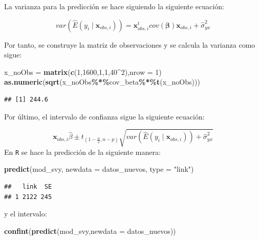 \documentclass[
  12pt,
]{book}
\newenvironment{Shaded}{\begin{snugshade}}{\end{snugshade}}
\newcommand{\AttributeTok}[1]{\textcolor[rgb]{0.13,0.29,0.53}{#1}}
\newcommand{\DecValTok}[1]{\textcolor[rgb]{0.00,0.00,0.81}{#1}}
\newcommand{\FunctionTok}[1]{\textcolor[rgb]{0.13,0.29,0.53}{\textbf{#1}}}
\newcommand{\NormalTok}[1]{#1}
\newcommand{\OtherTok}[1]{\textcolor[rgb]{0.56,0.35,0.01}{#1}}
\newcommand{\SpecialCharTok}[1]{\textcolor[rgb]{0.81,0.36,0.00}{\textbf{#1}}}
\newcommand{\StringTok}[1]{\textcolor[rgb]{0.31,0.60,0.02}{#1}}
\begin{document}
La varianza para la predicción se hace siguiendo la siguiente ecuación:

\[
var\left(\hat{E}\left(y_{i}\mid\boldsymbol{x}_{obs,i}\right)\right)=\boldsymbol{x}_{obs,i}^{t}cov\left(\boldsymbol{\beta}\right)\boldsymbol{x}_{obs,i} + \hat{\sigma}^2_{yx}
\]

Por tanto, se construye la matriz de observaciones y se calcula la varianza como sigue:

\begin{Shaded}
\begin{Highlighting}[]
\NormalTok{x\_noObs }\OtherTok{=} \FunctionTok{matrix}\NormalTok{(}\FunctionTok{c}\NormalTok{(}\DecValTok{1}\NormalTok{,}\DecValTok{1600}\NormalTok{,}\DecValTok{1}\NormalTok{,}\DecValTok{1}\NormalTok{,}\DecValTok{40}\SpecialCharTok{\^{}}\DecValTok{2}\NormalTok{),}\AttributeTok{nrow =} \DecValTok{1}\NormalTok{)}
\FunctionTok{as.numeric}\NormalTok{(}\FunctionTok{sqrt}\NormalTok{(x\_noObs}\SpecialCharTok{\%*\%}\NormalTok{cov\_beta}\SpecialCharTok{\%*\%}\FunctionTok{t}\NormalTok{(x\_noObs)))}
\end{Highlighting}
\end{Shaded}

\begin{verbatim}
## [1] 244.6
\end{verbatim}

Por último, el intervalo de confianza sigue la siguiente ecuación:

\[
\boldsymbol{x}_{obs,i}\hat{\beta}\pm t_{\left(1-\frac{\alpha}{2},n-p\right)}\sqrt{var\left(\hat{E}\left(y_{i}\mid\boldsymbol{x}_{obs,i}\right)\right)+\hat{\sigma}_{yx}^{2}}
\]
En \texttt{R} se hace la predicción de la siguiente manera:

\begin{Shaded}
\begin{Highlighting}[]
\FunctionTok{predict}\NormalTok{(mod\_svy, }\AttributeTok{newdata =}\NormalTok{ datos\_nuevos, }\AttributeTok{type =}  \StringTok{"link"}\NormalTok{)}
\end{Highlighting}
\end{Shaded}

\begin{verbatim}
##   link  SE
## 1 2122 245
\end{verbatim}

y el intervalo:

\begin{Shaded}
\begin{Highlighting}[]
\FunctionTok{confint}\NormalTok{(}\FunctionTok{predict}\NormalTok{(mod\_svy,}\AttributeTok{newdata =}\NormalTok{ datos\_nuevos))}
\end{Highlighting}
\end{Shaded}
\end{document}
